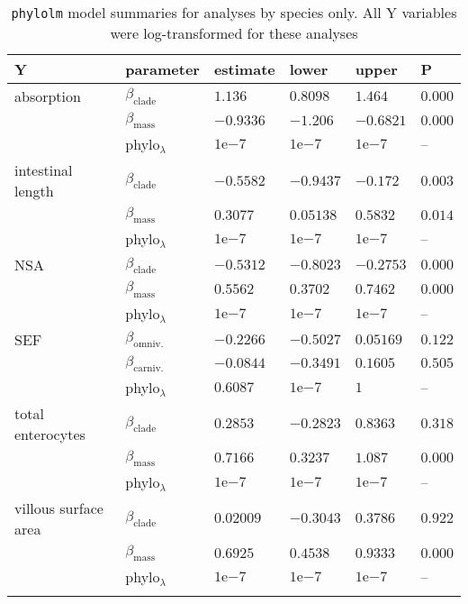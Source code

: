 \documentclass[12pt,]{article}
\begin{document}
\begin{table}[t]

\caption{\label{tab:results-spp-summs}\texttt{phylolm} model summaries for analyses by species only. All Y variables were log-transformed for these analyses}
\centering
\begin{tabular}{llllll}
\toprule
Y & parameter & estimate & lower & upper & P\\
\midrule
absorption & $\beta_{\text{clade}}$ & $1.136$ & $0.8098$ & $1.464$ & $0.000$\\
 & $\beta_{\text{mass}}$ & $-0.9336$ & $-1.206$ & $-0.6821$ & $0.000$\\
 & phylo$_{\lambda}$ & $1 \mathrm{e}{-7}$ & $1 \mathrm{e}{-7}$ & $1 \mathrm{e}{-7}$ & –\\
\addlinespace
intestinal length & $\beta_{\text{clade}}$ & $-0.5582$ & $-0.9437$ & $-0.172$ & $0.003$\\
 & $\beta_{\text{mass}}$ & $0.3077$ & $0.05138$ & $0.5832$ & $0.014$\\
 & phylo$_{\lambda}$ & $1 \mathrm{e}{-7}$ & $1 \mathrm{e}{-7}$ & $1 \mathrm{e}{-7}$ & –\\
\addlinespace
NSA & $\beta_{\text{clade}}$ & $-0.5312$ & $-0.8023$ & $-0.2753$ & $0.000$\\
 & $\beta_{\text{mass}}$ & $0.5562$ & $0.3702$ & $0.7462$ & $0.000$\\
 & phylo$_{\lambda}$ & $1 \mathrm{e}{-7}$ & $1 \mathrm{e}{-7}$ & $1 \mathrm{e}{-7}$ & –\\
\addlinespace
SEF & $\beta_{\text{omniv.}}$ & $-0.2266$ & $-0.5027$ & $0.05169$ & $0.122$\\
 & $\beta_{\text{carniv.}}$ & $-0.0844$ & $-0.3491$ & $0.1605$ & $0.505$\\
 & phylo$_{\lambda}$ & $0.6087$ & $1 \mathrm{e}{-7}$ & $1$ & –\\
\addlinespace
total enterocytes & $\beta_{\text{clade}}$ & $0.2853$ & $-0.2823$ & $0.8363$ & $0.318$\\
 & $\beta_{\text{mass}}$ & $0.7166$ & $0.3237$ & $1.087$ & $0.000$\\
 & phylo$_{\lambda}$ & $1 \mathrm{e}{-7}$ & $1 \mathrm{e}{-7}$ & $1 \mathrm{e}{-7}$ & –\\
\addlinespace
villous surface area & $\beta_{\text{clade}}$ & $0.02009$ & $-0.3043$ & $0.3786$ & $0.922$\\
 & $\beta_{\text{mass}}$ & $0.6925$ & $0.4538$ & $0.9333$ & $0.000$\\
 & phylo$_{\lambda}$ & $1 \mathrm{e}{-7}$ & $1 \mathrm{e}{-7}$ & $1 \mathrm{e}{-7}$ & –\\
\addlinespace
\bottomrule
\end{tabular}
\end{table}
\end{document}
